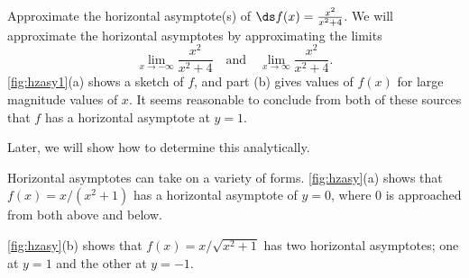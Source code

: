 %

\begin{example}\label{ex_hzasy1}
Approximate the horizontal asymptote(s) of $\ds f(x)=\frac{x^2}{x^2+4}$.
\solution
We will approximate the horizontal asymptotes by approximating the limits\vspace{-.3\baselineskip}
\[
\lim_{x\to-\infty} \frac{x^2}{x^2+4}\quad \text{and}\quad \lim_{x\to\infty} \frac{x^2}{x^2+4}.
\]
\autoref{fig:hzasy1}(a) shows a sketch of $f$, and part (b) gives values of $f(x)$ for large magnitude values of $x$. It seems reasonable to conclude from both of these sources that $f$ has a horizontal asymptote at $y=1$.

Later, we will show how to determine this analytically.
\end{example}

Horizontal asymptotes can take on a variety of forms. \autoref{fig:hzasy}(a) shows that $f(x) = x/(x^2+1)$ has a horizontal asymptote of $y=0$, where 0 is approached from both above and below.

\autoref{fig:hzasy}(b) shows that $f(x) =x/\sqrt{x^2+1}$ has two horizontal asymptotes; one at $y=1$ and the other at $y=-1$.

